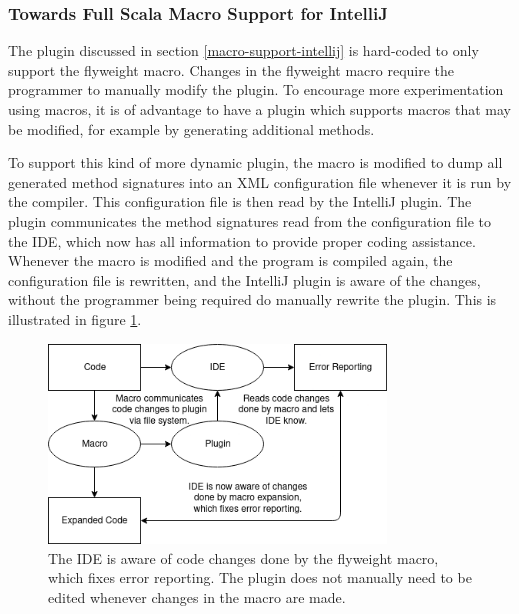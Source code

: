 \documentclass[11pt]{article}
\begin{document}
    \subsubsection{Towards Full Scala Macro Support for IntelliJ} \label{full-scala-macro-support}

    The plugin discussed in section \ref{macro-support-intellij} is hard-coded to only support the flyweight macro.
    Changes in the flyweight macro require the programmer to manually modify
    the plugin.
    To encourage more experimentation using macros, it is of advantage
    to have a plugin which supports macros that may be modified, for example
    by generating additional methods.

    To support this kind of more dynamic plugin, the macro is modified to
    dump all generated method signatures into an XML configuration file whenever
    it is run by the compiler.
    This configuration file is then read by the IntelliJ plugin. The plugin
    communicates the method signatures read from the configuration file
    to the IDE, which now has all information to provide proper
    coding assistance.
    Whenever the macro is modified and the program is compiled again,
    the configuration file is rewritten, and the IntelliJ plugin is
    aware of the changes, without the programmer being required
    do manually rewrite the plugin. This is illustrated in figure \ref{fig:ide-fixed-generic}.

    \begin{figure}[H]
        \begin{center}
            \includegraphics[width=0.8\textwidth]{ide-fixed-generic.png}
            \caption{
                The IDE is aware of code changes done by the flyweight macro,
                which fixes error reporting. The plugin does not manually need
                to be edited whenever changes in the macro are made.
            }
            \label{fig:ide-fixed-generic}
        \end{center}   
    \end{figure}
\end{document}
